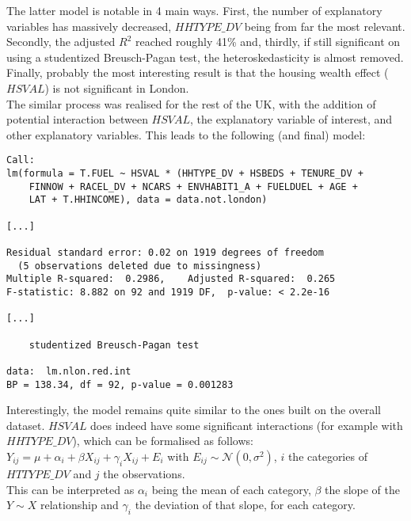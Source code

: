 \documentclass[12pt]{article}
\begin{document}
The latter model is notable in 4 main ways. First, the number of explanatory variables has massively decreased, $HHTYPE\_DV$ being from far the most relevant. Secondly, the adjusted $R^2$ reached roughly 41\% and, thirdly, if still significant on using a studentized Breusch-Pagan test, the heteroskedasticity is almost removed. Finally, probably the most interesting result is that the housing wealth effect ($HSVAL$) is not significant in London.\\

The similar process was realised for the rest of the UK, with the addition of potential interaction between $HSVAL$, the explanatory variable of interest, and other explanatory variables. This leads to the following (and final) model:

\begin{Answer}
\begin{verbatim}
Call:
lm(formula = T.FUEL ~ HSVAL * (HHTYPE_DV + HSBEDS + TENURE_DV + 
    FINNOW + RACEL_DV + NCARS + ENVHABIT1_A + FUELDUEL + AGE + 
    LAT + T.HHINCOME), data = data.not.london)

[...]
    
Residual standard error: 0.02 on 1919 degrees of freedom
  (5 observations deleted due to missingness)
Multiple R-squared:  0.2986,	Adjusted R-squared:  0.265 
F-statistic: 8.882 on 92 and 1919 DF,  p-value: < 2.2e-16

[...]

	studentized Breusch-Pagan test

data:  lm.nlon.red.int
BP = 138.34, df = 92, p-value = 0.001283
\end{verbatim}
\end{Answer} 

Interestingly, the model remains quite similar to the ones built on the overall dataset. $HSVAL$ does indeed have some significant interactions (for example with $HHTYPE\_DV$), which can be formalised as follows:\\

$Y_{ij} = \mu + \alpha_i + \beta X_{ij} + \gamma_i X_{ij} +  E_{i}$ with $ E_{ij} \sim \mathcal{N}(0,\sigma^2)$, $i$ the categories of $HTTYPE\_DV$ and $j$ the observations.\\

This can be interpreted as $\alpha_i$ being the mean of each category, $\beta$ the slope of the $Y \sim X$ relationship and $\gamma_i$ the deviation of that slope, for each category.\\
\end{document}

